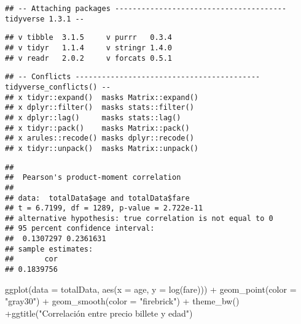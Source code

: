 \documentclass[
]{article}
\newenvironment{Shaded}{\begin{snugshade}}{\end{snugshade}}
\newcommand{\AttributeTok}[1]{\textcolor[rgb]{0.80,0.80,0.80}{#1}}
\newcommand{\FunctionTok}[1]{\textcolor[rgb]{0.94,0.94,0.56}{#1}}
\newcommand{\NormalTok}[1]{\textcolor[rgb]{0.80,0.80,0.80}{#1}}
\newcommand{\SpecialCharTok}[1]{\textcolor[rgb]{0.86,0.64,0.64}{#1}}
\newcommand{\StringTok}[1]{\textcolor[rgb]{0.80,0.58,0.58}{#1}}
\begin{document}
\begin{verbatim}
## -- Attaching packages --------------------------------------- tidyverse 1.3.1 --
\end{verbatim}

\begin{verbatim}
## v tibble  3.1.5     v purrr   0.3.4
## v tidyr   1.1.4     v stringr 1.4.0
## v readr   2.0.2     v forcats 0.5.1
\end{verbatim}

\begin{verbatim}
## -- Conflicts ------------------------------------------ tidyverse_conflicts() --
## x tidyr::expand()  masks Matrix::expand()
## x dplyr::filter()  masks stats::filter()
## x dplyr::lag()     masks stats::lag()
## x tidyr::pack()    masks Matrix::pack()
## x arules::recode() masks dplyr::recode()
## x tidyr::unpack()  masks Matrix::unpack()
\end{verbatim}

\begin{Shaded}
\end{Shaded}

\begin{verbatim}
## 
##  Pearson's product-moment correlation
## 
## data:  totalData$age and totalData$fare
## t = 6.7199, df = 1289, p-value = 2.722e-11
## alternative hypothesis: true correlation is not equal to 0
## 95 percent confidence interval:
##  0.1307297 0.2361631
## sample estimates:
##       cor 
## 0.1839756
\end{verbatim}

\begin{Shaded}
\begin{Highlighting}[]
\FunctionTok{ggplot}\NormalTok{(}\AttributeTok{data =}\NormalTok{ totalData, }\FunctionTok{aes}\NormalTok{(}\AttributeTok{x =}\NormalTok{ age, }\AttributeTok{y =} \FunctionTok{log}\NormalTok{(fare))) }\SpecialCharTok{+} \FunctionTok{geom\_point}\NormalTok{(}\AttributeTok{color =} \StringTok{"gray30"}\NormalTok{) }\SpecialCharTok{+} \FunctionTok{geom\_smooth}\NormalTok{(}\AttributeTok{color =} \StringTok{"firebrick"}\NormalTok{) }\SpecialCharTok{+} \FunctionTok{theme\_bw}\NormalTok{() }\SpecialCharTok{+}\FunctionTok{ggtitle}\NormalTok{(}\StringTok{"Correlación entre precio billete y edad"}\NormalTok{)}
\end{Highlighting}
\end{Shaded}
\end{document}
